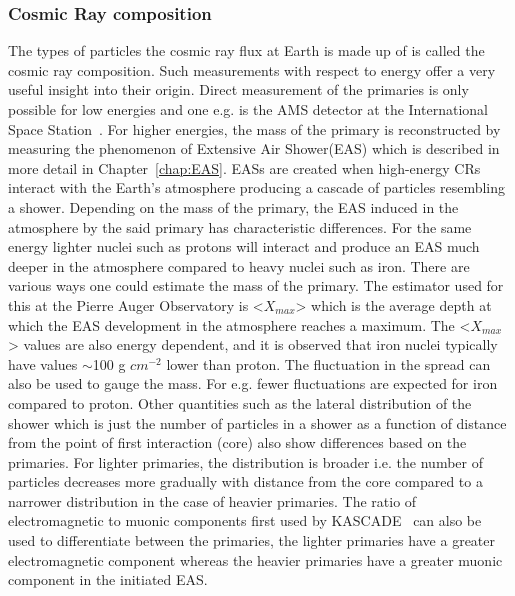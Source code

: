 \subsubsection*{Cosmic Ray composition}
\label{subsubsec:CRcompo}
The types of particles the cosmic ray flux at Earth is made up of is called the cosmic ray composition. Such measurements with respect to energy offer a very useful insight into their origin. Direct measurement of the primaries is only possible for low energies and one e.g. is the AMS detector at the International Space Station~\cite{PhysRevLett.110.141102}. For higher energies, the mass of the primary is reconstructed by measuring the phenomenon of Extensive Air Shower(EAS) which is described in more detail in Chapter~\ref{chap:EAS}. EASs are created when high-energy CRs interact with the Earth's atmosphere producing a cascade of particles resembling a shower.  Depending on the mass of the primary, the EAS induced in the atmosphere by the said primary has characteristic differences. For the same energy lighter nuclei such as protons will interact and produce an EAS much deeper in the atmosphere compared to heavy nuclei such as iron. There are various ways one could estimate the mass of the primary. The estimator used for this at the Pierre Auger Observatory is <$X_{max}$> which is the average depth at which the EAS development in the atmosphere reaches a maximum. The <$X_{max}$> values are also energy dependent, and it is observed that iron nuclei typically have values $\sim$100 g $cm^{-2}$ lower than proton. The fluctuation in the spread can also be used to gauge the mass. For e.g. fewer fluctuations are expected for iron compared to proton. Other quantities such as the lateral distribution of the shower which is just the number of particles in a shower as a function of distance from the point of first interaction (core) also show differences based on the primaries. For lighter primaries, the distribution is broader i.e. the number of particles decreases more gradually with distance from the core compared to a narrower distribution in the case of heavier primaries. The ratio of electromagnetic to muonic components first used by KASCADE~\cite{SCHATZ1998151} can also be used to differentiate between the primaries, the lighter primaries have a greater electromagnetic component whereas the heavier primaries have a greater muonic component in the initiated EAS.    

